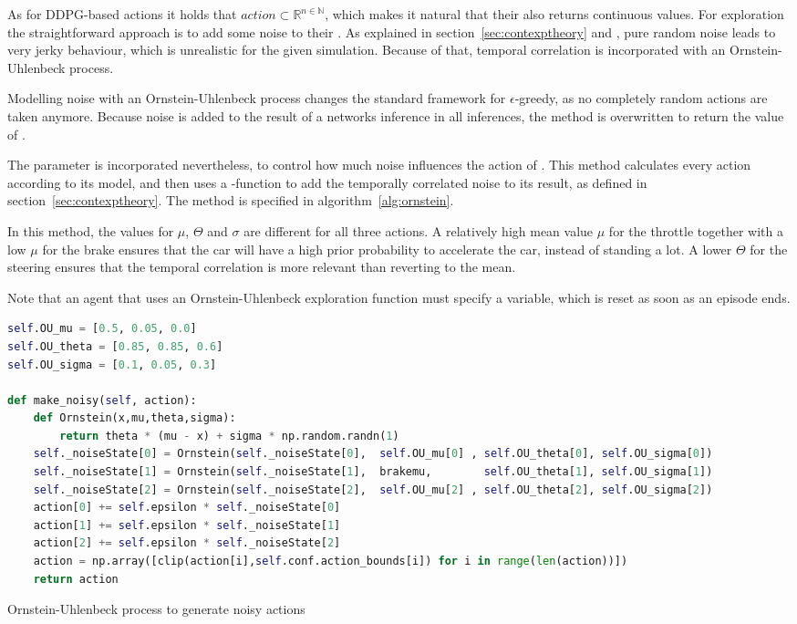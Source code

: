 As for DDPG-based actions it holds that $action \subset \mathds{R}^{n \in \mathds{N}}$, which makes it natural that their  also returns continuous values. For exploration the straightforward approach is to add some noise to their . As explained in section~\ref{sec:contexptheory} and \cite{wawrzynski_control_2015}, pure random noise leads to very jerky behaviour, which is unrealistic for the given simulation. Because of that, temporal correlation is incorporated with an  Ornstein-Uhlenbeck process.

Modelling noise with an Ornstein-Uhlenbeck process changes the standard framework for $\epsilon$-greedy, as no completely random actions are taken anymore. Because noise is added to the result of a networks inference in all inferences, the method  is overwritten to return the value of . 

The parameter  is incorporated nevertheless, to control how much noise influences the action of . This method calculates every action according to its model, and then uses a -function to add the temporally correlated noise to its result, as defined in section~\ref{sec:contexptheory}. The method  is specified in algorithm~\ref{alg:ornstein}. 

In this method, the values for $\mu$, $\Theta$ and $\sigma$ are different for all three actions. A relatively high mean value $\mu$ for the throttle together with a low $\mu$ for the brake ensures that the car will have a high prior probability to accelerate the car, instead of standing a lot. A lower $\Theta$ for the steering ensures that the temporal correlation is more relevant than reverting to the mean.

Note that an agent that uses an Ornstein-Uhlenbeck exploration function must specify a  variable, which is reset as soon as an episode ends.

\begin{algorithm}[h]
	\begin{lstlisting}[language=Python, style=Python, frame=none]
self.OU_mu = [0.5, 0.05, 0.0]
self.OU_theta = [0.85, 0.85, 0.6]
self.OU_sigma = [0.1, 0.05, 0.3]

def make_noisy(self, action):
	def Ornstein(x,mu,theta,sigma):
		return theta * (mu - x) + sigma * np.random.randn(1)
	self._noiseState[0] = Ornstein(self._noiseState[0],  self.OU_mu[0] , self.OU_theta[0], self.OU_sigma[0])
	self._noiseState[1] = Ornstein(self._noiseState[1],  brakemu,        self.OU_theta[1], self.OU_sigma[1])  
	self._noiseState[2] = Ornstein(self._noiseState[2],  self.OU_mu[2] , self.OU_theta[2], self.OU_sigma[2])
	action[0] += self.epsilon * self._noiseState[0]
	action[1] += self.epsilon * self._noiseState[1]
	action[2] += self.epsilon * self._noiseState[2]
	action = np.array([clip(action[i],self.conf.action_bounds[i]) for i in range(len(action))])
	return action
	\end{lstlisting}%
	\caption{Ornstein-Uhlenbeck process to generate noisy actions}
	\label{alg:ornstein}
\end{algorithm}


